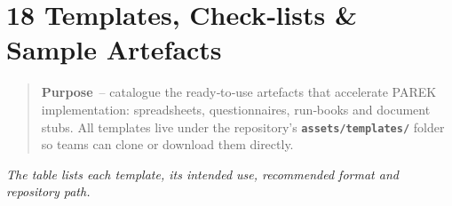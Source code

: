 \documentclass[
  english,
]{article}
\begin{document}
\section{18 Templates, Check‑lists \& Sample
Artefacts}\label{templates-checklists-sample-artefacts}

\begin{quote}
\textbf{Purpose}~-- catalogue the ready‑to‑use artefacts that accelerate
PAREK implementation: spreadsheets, questionnaires, run‑books and
document stubs. All templates live under the repository's
\textbf{\texttt{assets/templates/}} folder so teams can clone or
download them directly.
\end{quote}

\emph{The table lists each template, its intended use, recommended
format and repository path.}
\end{document}
